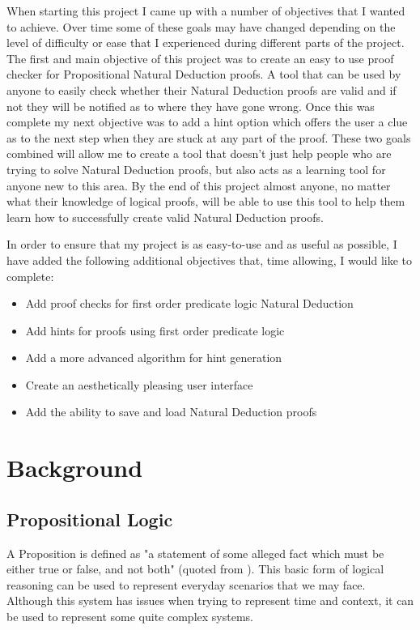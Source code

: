 When starting this project I came up with a number of objectives that I wanted to achieve. Over time some of these goals may have changed depending on the level of difficulty or ease that I experienced during different parts of the project. The first and main objective of this project was to create an easy to use proof checker for Propositional Natural Deduction proofs. A tool that can be used by anyone to easily check whether their Natural Deduction proofs are valid and if not they will be notified as to where they have gone wrong. Once this was complete my next objective was to add a hint option which offers the user a clue as to the next step when they are stuck at any part of the proof. These two goals combined will allow me to create a tool that doesn't just help people who are trying to solve Natural Deduction proofs, but also acts as a learning tool for anyone new to this area. By the end of this project almost anyone, no matter what their knowledge of logical proofs, will be able to use this tool to help them learn how to successfully create valid Natural Deduction proofs.

In order to ensure that my project is as easy-to-use and as useful as possible, I have added the following additional objectives that, time allowing, I would like to complete:
\begin{itemize}
\item Add proof checks for first order predicate logic Natural Deduction
\item Add hints for proofs using first order predicate logic
\item Add a more advanced algorithm for hint generation
\item Create an aesthetically pleasing user interface
\item Add the ability to save and load Natural Deduction proofs
\end{itemize}

\pagebreak

\section{Background \label{Background}}

\subsection{Propositional Logic}

A Proposition is defined as "a statement of some alleged fact which must be either true or false, and not both" (quoted from \cite{ndBook}). This basic form of logical reasoning can be used to represent everyday scenarios that we may face. Although this system has issues when trying to represent time and context, it can be used to represent some quite complex systems.

